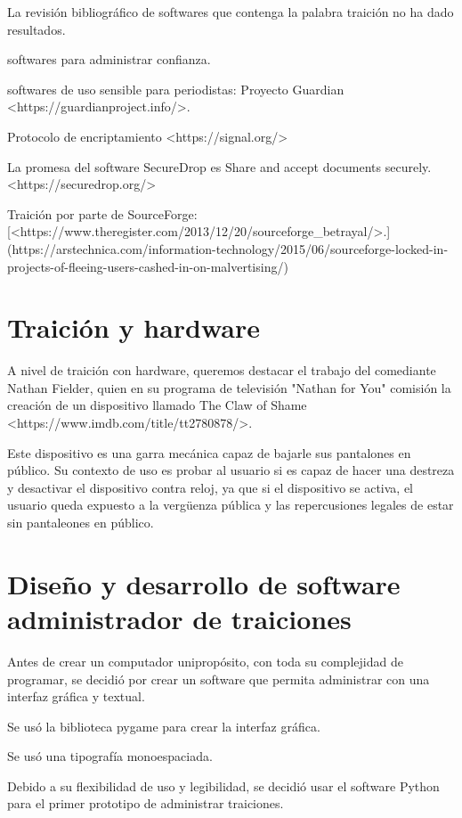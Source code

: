 \documentclass{article}
\begin{document}
La revisión bibliográfico de softwares que contenga la palabra traición no ha dado resultados.

softwares para administrar confianza.

softwares de uso sensible para periodistas: Proyecto Guardian <https://guardianproject.info/>.

Protocolo de encriptamiento <https://signal.org/>

La promesa del software SecureDrop es Share and accept documents securely. <https://securedrop.org/>

Traición por parte de SourceForge: [<https://www.theregister.com/2013/12/20/sourceforge_betrayal/>.](https://arstechnica.com/information-technology/2015/06/sourceforge-locked-in-projects-of-fleeing-users-cashed-in-on-malvertising/)

\clearpage

\section{Traición y hardware}


A nivel de traición con hardware, queremos destacar el trabajo del comediante Nathan Fielder, quien en su programa de televisión "Nathan for You" comisión la creación de un dispositivo llamado The Claw of Shame <https://www.imdb.com/title/tt2780878/>.

Este dispositivo es una garra mecánica capaz de bajarle sus pantalones en público. Su contexto de uso es probar al usuario si es capaz de hacer una destreza y desactivar el dispositivo contra reloj, ya que si el dispositivo se activa, el usuario queda expuesto a la vergüenza pública y las repercusiones legales de estar sin pantaleones en público.

\clearpage

\section{Diseño y desarrollo de software administrador de traiciones}

Antes de crear un computador unipropósito, con toda su complejidad de programar, se decidió por crear un software que permita administrar con una interfaz gráfica y textual.

Se usó la biblioteca pygame para crear la interfaz gráfica.

Se usó una tipografía monoespaciada.

Debido a su flexibilidad de uso y legibilidad, se decidió usar el software Python para el primer prototipo de administrar traiciones.
\end{document}
